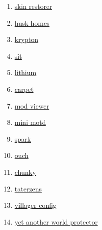 \begin{enumerate}
    \item \href{https://github.com/Suiranoil/SkinRestorer}{skin restorer}
    \item \href{https://github.com/WiIIiam278/HuskHomes/}{husk homes}
    \item \href{https://github.com/astei/krypton}{krypton}
    \item \href{https://github.com/bl4ckscor3/Sit}{sit}
    \item \href{https://github.com/caffeinemc/lithium-fabric}{lithium}
    \item \href{https://github.com/gnembon/fabric-carpet}{carpet}
    \item \href{https://github.com/haykam821/Mod-Viewer}{mod viewer}
    \item \href{https://github.com/jpenilla/MiniMOTD}{mini motd}
    \item \href{https://github.com/lucko/spark}{spark}
    \item \href{https://github.com/patbox/ouch}{ouch}
    \item \href{https://github.com/pop4959/Chunky}{chunky}
    \item \href{https://github.com/samolego/Taterzens/}{taterzens}
    \item \href{https://modrinth.com/mod/villagerconfig}{villager config}
    \item \href{https://modrinth.com/mod/yawp}{yet another world protector}
\end{enumerate}


